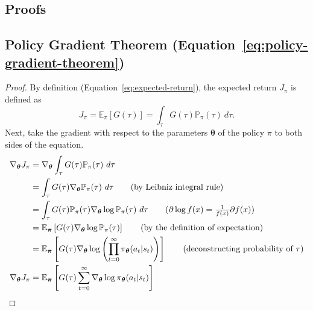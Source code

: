 \documentclass[12pt]{report}
\theoremstyle{definition}
\theoremstyle{remark}
\begin{document}
\begin{appendices}
\chapter{Proofs}
\section{Policy Gradient Theorem (Equation~\ref{eq:policy-gradient-theorem})}\label{sec:policy-gradient-theorem-proof}
\begin{proof}
    By definition (Equation~\ref{eq:expected-return}), the expected return $J_\pi$ is defined as
    \begin{equation*}
        J_\pi = \mathbb{E}_\pi[G(\tau)] = \int_{\tau} G(\tau)\mathbb{P}_{\pi}(\tau)\ d\tau.
    \end{equation*}
    Next, take the gradient with respect to the parameters $\boldsymbol{\theta}$ of the policy $\pi$ to both sides of the equation.
    \begin{align*}
        \nabla_{\boldsymbol{\theta}} J_\pi &= \nabla_{\boldsymbol{\theta}} \int_{\tau} G(\tau)\mathbb{P}_{\pi}(\tau)\ d\tau \\
        &= \int_{\tau} G(\tau) \nabla_{\boldsymbol{\theta}} \mathbb{P}_{\pi}(\tau)\ d\tau \tag{by Leibniz integral rule} \\
        &= \int_{\tau} G(\tau) \mathbb{P}_{\pi}(\tau) \nabla_{\boldsymbol{\theta}} \log \mathbb{P}_{\pi}(\tau)\ d\tau \tag{$\partial \log f(x) = \frac{1}{f(x)}\partial f(x)$} \\
        &= \mathbb{E}_{\boldsymbol{\pi}}\left[G(\tau) \nabla_{\boldsymbol{\theta}} \log \mathbb{P}_{\pi}(\tau)\right] \tag{by the definition of expectation} \\
        &= \mathbb{E}_{\boldsymbol{\pi}}\left[G(\tau) \nabla_{\boldsymbol{\theta}} \log \left(\prod_{t=0}^{\infty} \pi_{\boldsymbol{\theta}}(a_t | s_t)\right)\right] \tag{deconstructing probability of $\tau$} \\
        \nabla_{\boldsymbol{\theta}} J_\pi &= \mathbb{E}_{\boldsymbol{\pi}}\left[G(\tau) \sum_{t=0}^{\infty} \nabla_{\boldsymbol{\theta}} \log \pi_{\boldsymbol{\theta}}(a_t | s_t)\right]
    \end{align*}
\end{proof}


\end{appendices}
\end{document}
